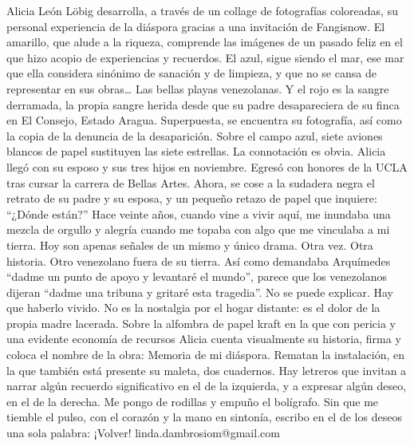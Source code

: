 \documentclass{article}%
\begin{document}
\newline%
%
Alicia León Löbig desarrolla, a través de un collage de fotografías coloreadas, su personal experiencia de la diáspora gracias a una invitación de Fangisnow.%
\newline%
%
El amarillo, que alude a la riqueza, comprende las imágenes de un pasado feliz en el que hizo acopio de experiencias y recuerdos. El azul, sigue siendo el mar, ese mar que ella considera sinónimo de sanación y de limpieza, y que no se cansa de representar en sus obras… Las bellas playas venezolanas. Y el rojo es la sangre derramada, la propia sangre herida desde que su padre desapareciera de su finca en El Consejo, Estado Aragua. Superpuesta, se encuentra su fotografía, así como la copia de la denuncia de la desaparición.%
\newline%
%
Sobre el campo azul, siete aviones blancos de papel sustituyen las siete estrellas. La connotación es obvia.%
\newline%
%
Alicia llegó con su esposo y sus tres hijos en noviembre. Egresó con honores de la UCLA tras cursar la carrera de Bellas Artes. Ahora, se cose a la sudadera negra el retrato de su padre y su esposa, y un pequeño retazo de papel que inquiere: “¿Dónde están?”%
\newline%
%
Hace veinte años, cuando vine a vivir aquí, me inundaba una mezcla de orgullo y alegría cuando me topaba con algo que me vinculaba a mi tierra. Hoy son apenas señales de un mismo y único drama.%
\newline%
%
Otra vez. Otra historia. Otro venezolano fuera de su tierra. Así como demandaba Arquímedes “dadme un punto de apoyo y levantaré el mundo”, parece que los venezolanos dijeran “dadme una tribuna y gritaré esta tragedia”. No se puede explicar. Hay que haberlo vivido. No es la nostalgia por el hogar distante: es el dolor de la propia madre lacerada.%
\newline%
%
Sobre la alfombra de papel kraft en la que con pericia y una evidente economía de recursos Alicia cuenta visualmente su historia, firma y coloca el nombre de la obra: Memoria de mi diáspora.%
\newline%
%
Rematan la instalación, en la que también está presente su maleta, dos cuadernos.  Hay letreros que invitan a narrar algún recuerdo significativo en el de la  izquierda, y a expresar algún deseo, en  el de la derecha.%
\newline%
%
Me pongo de rodillas y empuño el bolígrafo. Sin que me tiemble el pulso, con el corazón y la mano en sintonía, escribo en el de los deseos una sola palabra:%
\newline%
%
¡Volver!%
\newline%
%
linda.dambrosiom@gmail.com%
\newline%
%
\end{document}
